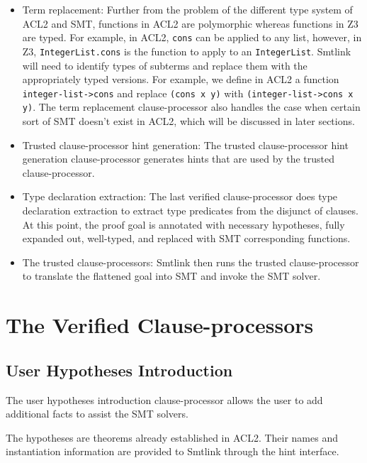 \begin{itemize}
  \item Term replacement: Further from the problem of the different type system of ACL2 and SMT, functions
    in ACL2 are polymorphic whereas functions in Z3 are typed. For example, in ACL2,
    \texttt{cons} can be applied to any list, however, in Z3,
    \texttt{IntegerList.cons} is the function to apply to an \texttt{IntegerList}.
    Smtlink will need to identify types of subterms and replace them with the
    appropriately typed versions. For example, we define in ACL2 a function
    \texttt{integer-list->cons} and replace \texttt{(cons x y)} with
    \texttt{(integer-list->cons x y)}. The term replacement clause-processor also
    handles the case when certain sort of SMT doesn't exist in ACL2, which will be
    discussed in later sections.

  \item Trusted clause-processor hint generation: The trusted clause-processor hint generation clause-processor generates hints
    that are used by the trusted clause-processor.
  \item Type declaration extraction: The last verified
    clause-processor does type declaration extraction to extract type predicates
    from the disjunct of clauses. At this point, the proof goal is annotated with
    necessary hypotheses, fully expanded out, well-typed, and replaced with SMT
    corresponding functions.
  \item The trusted clause-processors: Smtlink then runs the trusted clause-processor to
    translate the flattened goal into SMT and invoke the SMT solver.
\end{itemize}


\section{The Verified Clause-processors}
\label{sec:vcp}

\subsection{User Hypotheses Introduction}
The user hypotheses introduction clause-processor allows the user to add
additional facts to assist the SMT solvers.

The hypotheses are theorems already established in ACL2. Their names and
instantiation information are provided to Smtlink through the hint interface.

